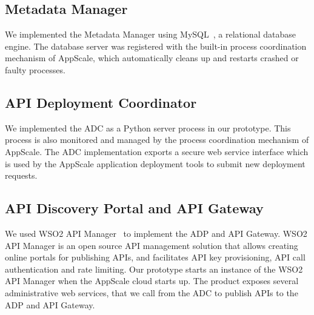 \subsection{Metadata Manager} 
We implemented the Metadata Manager using MySQL~\cite{XXXmysqlXXX},
a relational database engine.  The database server was registered with the
built-in process coordination mechanism of AppScale, which automatically
cleans up and restarts crashed or faulty processes. 

\subsection{API Deployment Coordinator}

We implemented the ADC as a Python server process in our prototype. This
process is also monitored and managed by the process coordination mechanism of
AppScale. The ADC implementation exports a secure web service interface which
is used by the AppScale application deployment tools to submit new deployment
requests. 


\subsection{API Discovery Portal and API Gateway}

We used WSO2 API Manager~\cite{wso2am} to implement the ADP and API Gateway.
WSO2 API Manager is an open source API management solution that allows
creating online portals for publishing APIs, and facilitates API key
provisioning, API call authentication and rate limiting.  Our prototype starts
an instance of the WSO2 API Manager when the AppScale cloud starts up. The
product exposes several administrative web services, that we call from the ADC
to publish APIs to the ADP and API Gateway. 
